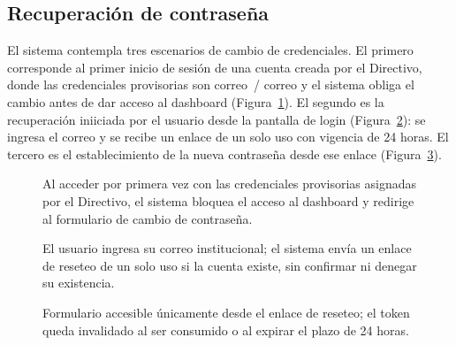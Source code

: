 \subsection{Recuperación de contraseña}
\label{subsec:cap_reset}

El sistema contempla tres escenarios de cambio de credenciales. El primero
corresponde al primer inicio de sesión de una cuenta creada por el Directivo,
donde las credenciales provisorias son correo~/ correo y el sistema obliga
el cambio antes de dar acceso al dashboard
(Figura~\ref{fig:cap_reset_primer_login}). El segundo es la recuperación
iniiciada por el usuario desde la pantalla de login
(Figura~\ref{fig:cap_reset_solicitud}): se ingresa el correo y se recibe
un enlace de un solo uso con vigencia de 24 horas. El tercero es el
establecimiento de la nueva contraseña desde ese enlace
(Figura~\ref{fig:cap_reset_nueva}).

\begin{figure}[H]
  \centering
  \caption[Cambio de contraseña obligatorio en el primer inicio de sesión.]{Al
    acceder por primera vez con las credenciales provisorias asignadas por
    el Directivo, el sistema bloquea el acceso al dashboard y redirige
    al formulario de cambio de contraseña.}
  \label{fig:cap_reset_primer_login}
\end{figure}

\begin{figure}[H]
  \centering
  \caption[Solicitud de recuperación de contraseña.]{El usuario ingresa su
    correo institucional; el sistema envía un enlace de reseteo de un solo
    uso si la cuenta existe, sin confirmar ni denegar su existencia.}
  \label{fig:cap_reset_solicitud}
\end{figure}

\begin{figure}[H]
  \centering
  \caption[Establecimiento de nueva contraseña.]{Formulario accesible
    únicamente desde el enlace de reseteo; el token queda invalidado al
    ser consumido o al expirar el plazo de 24 horas.}
  \label{fig:cap_reset_nueva}
\end{figure}

